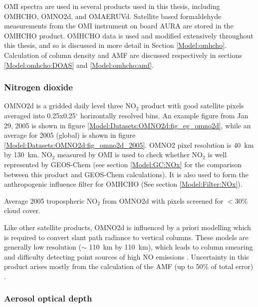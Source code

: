       OMI spectra are used in several products used in this thesis, including OMHCHO, OMNO2d, and OMAERUVd.
      Satellite based formaldehyde measurements from the OMI instrument on board AURA are stored in the OMHCHO product.
      OMHCHO data is used and modified extensively throughout this thesis, and so is discussed in more detail in Section \ref{Model:omhcho}.
      Calculation of column density and AMF are discussed respectively in sections \ref{Model:omhcho:DOAS} and \ref{Model:omhcho:amf}.
  
    \subsubsection{Nitrogen dioxide}
      \label{Model:Datasets:OMNO2d}
      OMNO2d is a gridded daily level three NO$_2$ product with good satellite pixels averaged into 0.25x0.25$^{\circ}$ horizontally resolved bins.
      An example figure from Jan 29, 2005 is shown in figure \ref{Model:Datasets:OMNO2d:fig_eg_omno2d}, while an average for 2005 (global) is shown in figure \ref{Model:Datasets:OMNO2d:fig_omno2d_2005}.
      OMNO2 pixel resolution is 40~km by 130~km.
      NO$_2$ measured by OMI is used to check whether NO$_2$ is well represented by GEOS-Chem (see section \ref{Model:GC:NOx} for the comparison between this product and GEOS-Chem calculations).
      It is also used to form the anthropogenic influence filter for OMHCHO (See section \ref{Model:Filter:NOx}).
      
      
      
      {Average 2005 tropospheric NO$_2$ from OMNO2d with pixels screened for $<30\%$ cloud cover.}
      {\label{Model:Datasets:OMNO2d:fig_omno2d_2005}}
      
      Like other satellite products, OMNO2d is influenced by a priori modelling which is required to convert slant path radiance to vertical columns.
      These models are generally low resolution ($\sim$ 110~km by 110~km), which leads to column smearing and difficulty detecting point sources of high NO emissions \parencite{Goldberg2018}.
      Uncertainty in this product arises mostly from the calculation of the AMF (up to 50\% of total error) \parencite{Lorente2017}.
    
    \subsubsection{Aerosol optical depth}
      \label{Model:Datasets:OMAERUVd}
      
